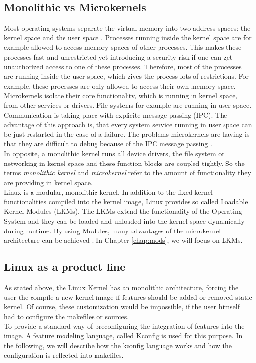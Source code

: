 \documentclass{sig-alternate-05-2015}
\begin{document}
\subsection{Monolithic vs Microkernels}
Most operating systems separate the virtual memory into two address spaces: the kernel space and the user space \cite{stankov2006discussion}. Processes running inside the kernel space are for example allowed to access memory spaces of other processes. This makes these processes fast and unrestricted yet introducing a security risk if one can get unauthorized access to one of these processes. Therefore, most of the processes are running inside the user space, which gives the process lots of restrictions. For example, these processes are only allowed to access their own memory space. \\
Microkernels isolate their core functionality, which is running in kernel space, from other services or drivers. File systems for example are running in user space. Communication is taking place with explicite message passing (IPC). The advantage of this approach is, that every system service running in user space can be just restarted in the case of a failure. The problems microkernels are having is that they are difficult to debug because of the IPC message passing \cite{le2005gnu}. \\
In opposite, a monolithic kernel runs all device drivers, the file system or networking in kernel space and these function blocks are coupled tightly. 
So the terms \emph{monolithic kernel} and \emph{microkernel} refer to the amount of functionality they are providing in kernel space.\\
Linux is a modular, monolithic kernel. In addition to the fixed kernel functionalities compiled into the kernel image, Linux provides so called Loadable Kernel Modules (LKMs). The LKMs extend the functionality of the Operating System and they can be loaded and unloaded into the kernel space dynamically during runtime. By using Modules,  many advantages of the microkernel architecture can be achieved \cite[pp. 11]{bovet2005understanding}. In Chapter \ref{chap:mods}, we will focus on LKMs. \\


\subsection{Linux as a product line}
As stated above, the Linux Kernel has an monolithic architecture, forcing the user the compile a new kernel image if features should be added or removed static kernel. Of course, these customization would be impossible, if the user himself had to configure the makefiles or sources.\\
To provide a standard way of preconfiguring the integration of features into the image. A feature modeling language, called Kconfig \cite{kconfig} is used for this purpose. In the following, we will describe how the kconfig language works and how the configuration is reflected into makefiles.
\end{document}
